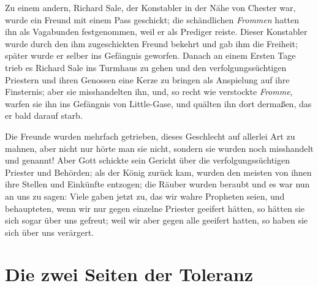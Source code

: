 Zu einem andern, Richard Sale, der 
Konstabler in der Nähe
von Chester war, wurde ein Freund mit einem Pass geschickt;
die schändlichen \textit{Frommen} hatten ihn als Vagabunden 
festgenommen, weil er als Prediger reiste. Dieser Konstabler wurde
durch den ihm zugeschickten Freund bekehrt und gab ihm die
Freiheit; später wurde er selber ins Gefängnis geworfen. Danach
an einem Ersten Tage trieb es Richard 
Sale ins Turmhaus zu
gehen und den verfolgungssüchtigen Priestern und ihren Genossen
eine Kerze zu bringen als Anspielung auf ihre Finsternis; aber
sie misshandelten ihn, und, so recht wie verstockte 
\textit{Fromme}, warfen 
sie ihn ins Gefängnis von Little-Gase, 
und quälten ihn dort dermaßen,
das er bald darauf starb. 

Die Freunde wurden mehrfach getrieben, 
dieses Geschlecht auf allerlei Art zu mahnen, aber nicht
nur hörte man sie nicht, sondern sie wurden noch misshandelt und
 genannt! Aber Gott schickte sein Gericht
  über die 
verfolgungssüchtigen Priester und Behörden; als der
König zurück kam, wurden den meisten von ihnen ihre Stellen und
Einkünfte entzogen; die Räuber wurden beraubt und es war nun
an uns zu sagen:  Viele gaben
jetzt zu, das wir wahre Propheten seien, 
und behaupteten, wenn
wir nur gegen einzelne Priester geeifert hätten, so hätten sie sich
sogar über uns gefreut; weil wir aber gegen alle geeifert hatten,
so haben sie sich über uns verärgert. 

\section{Die zwei Seiten der Toleranz}


